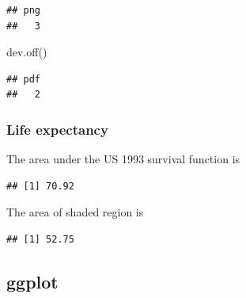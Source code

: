 \documentclass[
]{article}
\newenvironment{Shaded}{\begin{snugshade}}{\end{snugshade}}
\newcommand{\DecValTok}[1]{\textcolor[rgb]{0.00,0.00,0.81}{#1}}
\newcommand{\FunctionTok}[1]{\textcolor[rgb]{0.00,0.00,0.00}{#1}}
\newcommand{\NormalTok}[1]{#1}
\newcommand{\SpecialCharTok}[1]{\textcolor[rgb]{0.00,0.00,0.00}{#1}}
\begin{document}
\begin{verbatim}
## png 
##   3
\end{verbatim}

\begin{Shaded}
\begin{Highlighting}[]
\FunctionTok{dev.off}\NormalTok{()}
\end{Highlighting}
\end{Shaded}

\begin{verbatim}
## pdf 
##   2
\end{verbatim}

\hypertarget{life-expectancy-1}{%
\subsubsection{Life expectancy}\label{life-expectancy-1}}

The area under the US 1993 survival function is

\begin{Shaded}
\end{Shaded}

\begin{verbatim}
## [1] 70.92
\end{verbatim}

The area of shaded region is

\begin{Shaded}
\end{Shaded}

\begin{verbatim}
## [1] 52.75
\end{verbatim}

\hypertarget{ggplot}{%
\subsection{ggplot}\label{ggplot}}
\end{document}
